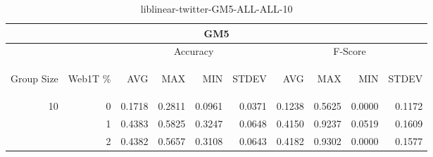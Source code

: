\begin{center}
\begin{table}[htbp]
\begin{tabular}{ | r | r | r | r | r | r | r | r | r | r |}
\hline
\multicolumn{10}{|c|}{GM5}\\
\hline
 & & \multicolumn{4}{|c|}{Accuracy} & \multicolumn{4}{|c|}{F-Score}\\ \cline{3-10}
\begin{sideways}Group Size\end{sideways} & \begin{sideways}Web1T \%\end{sideways} & \begin{sideways}AVG\end{sideways} & \begin{sideways}MAX\end{sideways} & \begin{sideways}MIN\end{sideways} & \begin{sideways}STDEV\end{sideways} & \begin{sideways}AVG\end{sideways} & \begin{sideways}MAX\end{sideways} & \begin{sideways}MIN\end{sideways} & \begin{sideways}STDEV\end{sideways}\\
\hline
\multirow{2}{*}{10}
 & 0 & 0.1718 & 0.2811 & 0.0961 & 0.0371 & 0.1238 & 0.5625 & 0.0000 & 0.1172\\ \cline{2-10}
 & 1 & 0.4383 & 0.5825 & 0.3247 & 0.0648 & 0.4150 & 0.9237 & 0.0519 & 0.1609\\ \cline{2-10}
 & 2 & 0.4382 & 0.5657 & 0.3108 & 0.0643 & 0.4182 & 0.9302 & 0.0000 & 0.1577\\ \cline{2-10}
\hline
\end{tabular}
\caption{liblinear-twitter-GM5-ALL-ALL-10}
\label{table:liblinear-twitter-GM5-ALL-ALL-10}
\end{table}
\end{center}

